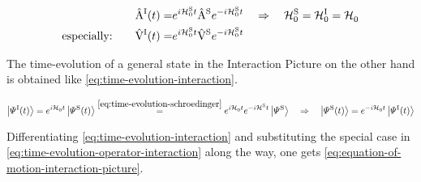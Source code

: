 \begin{equation}
    \label{eq:time-evolution-operator-interaction}
    \begin{split}
        \AopOfT[\interactionPicture] = &e^{i \HzeroHamiltonian[\schroedingerPicture]{} t} \Aop[\schroedingerPicture] e^{-i \HzeroHamiltonian[\schroedingerPicture]{} t}
        \quad \Rightarrow \quad 
        \HzeroHamiltonian[\schroedingerPicture]{} = \HzeroHamiltonian[\interactionPicture]{}= \HzeroHamiltonian[]{}\\
        \text{especially:} \qquad \VhamiltonianOfT[\interactionPicture] = &e^{i \HzeroHamiltonian[\schroedingerPicture]{} t} \Vhamiltonian[\schroedingerPicture] e^{-i \HzeroHamiltonian[\schroedingerPicture]{} t}
    \end{split}
\end{equation}

The time-evolution of a general state in the Interaction Picture on the other hand is obtained like \autoref{eq:time-evolution-interaction}.

\begin{equation}
    \label{eq:time-evolution-interaction}
    \ketpsiof[\interactionPicture]{t} = e^{i \HzeroHamiltonian{} t} \ketpsiof[\schroedingerPicture]{t} \stackrel{\ref{eq:time-evolution-schroedinger}}{=} e^{i \HzeroHamiltonian{} t} e^{-i \pictureHamiltonian[\schroedingerPicture]{} t} \ketpsi[\schroedingerPicture]{} 
    \quad \Rightarrow \quad 
    \ketpsiof[\schroedingerPicture]{t} = e^{-i \HzeroHamiltonian{} t} \ketpsiof[\interactionPicture]{t}
\end{equation}

Differentiating \autoref{eq:time-evolution-interaction} and substituting the special case in \autoref{eq:time-evolution-operator-interaction} along the way, one gets \autoref{eq:equation-of-motion-interaction-picture}.

